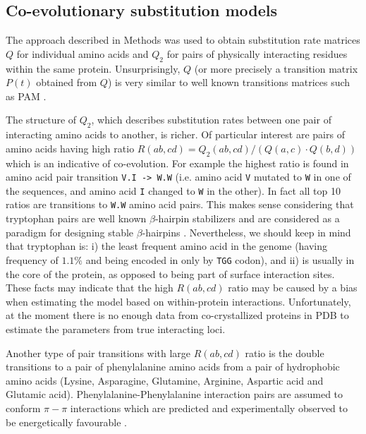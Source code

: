 \subsection{Co-evolutionary substitution models}

The approach described in Methods was used to obtain substitution rate matrices $Q$ for individual amino acids and $Q_2$ for pairs of physically interacting residues within the same protein. 
Unsurprisingly, $Q$ (or more precisely a transition matrix $P(t)$ obtained from $Q$) is very similar to well known transitions matrices such as PAM \cite{dayhoff1978model}. 

The structure of $Q_2$, which describes substitution rates between one pair of interacting amino acids to another, is richer.
Of particular interest are pairs of amino acids having high ratio $R(ab,cd) = Q_2 (ab, cd) / ( Q(a,c) \cdot Q(b,d) )$ which is an indicative of co-evolution.
For example the highest ratio is found in amino acid pair transition \texttt{V.I -> W.W} (i.e. amino acid \texttt{V} mutated to \texttt{W} in one of the sequences, and amino acid \texttt{I} changed to \texttt{W} in the other). 
In fact all top 10 ratios are transitions to \texttt{W.W} amino acid pairs.
This makes sense considering that
tryptophan pairs are well known $\beta$-hairpin stabilizers and are considered as a paradigm for designing stable $\beta$-hairpins \cite{santiveri2010tryptophan}.
Nevertheless, we should keep in mind that tryptophan is: 
i) the least frequent amino acid in the genome (having frequency of $1.1\%$ and being encoded in only by \texttt{TGG} codon), and
ii) is usually in the core of the protein, as opposed to being part of surface interaction sites.
These facts may indicate that the high $R(ab,cd)$ ratio may be caused by a bias when estimating the model based on within-protein interactions.
Unfortunately, at the moment there is no enough data from co-crystallized proteins in PDB to estimate the parameters from true interacting loci.

Another type of pair transitions with large $R(ab,cd)$ ratio is the double transitions to a pair of phenylalanine amino acids from a pair of hydrophobic amino acids (Lysine, Asparagine, Glutamine, Arginine, Aspartic acid and Glutamic acid). 
Phenylalanine-Phenylalanine interaction pairs are assumed to conform $\pi-\pi$ interactions which are predicted and experimentally observed to be energetically favourable \cite{hunter1991pi}.


